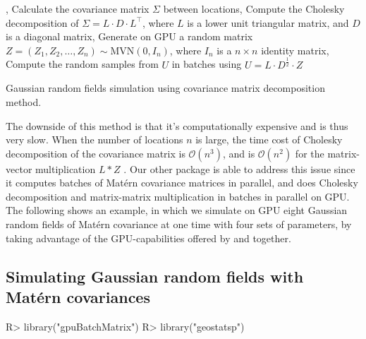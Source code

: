 \documentclass[article,nojss]{jss}\usepackage[]{graphicx}\usepackage[]{color}
\begin{document}
\begin{algorithm}[H]
, Calculate the covariance matrix $\Sigma$ between locations, Compute the Cholesky decomposition of $\Sigma = L \cdot D \cdot L^\top$, where $L$ is a lower unit triangular matrix, and $D$ is a diagonal matrix, Generate on GPU a random matrix $Z=(Z_1, Z_2, \dots, Z_n) \sim \text{MVN}(0,I_n)$, where $I_n$ is a $n \times n$ identity matrix, Compute the random samples from $U$ in batches using $U = L \cdot D^{\frac{1}{2}} \cdot Z$ \;
 \caption{Gaussian random fields simulation using covariance matrix decomposition method.}
 \label{algorithm2}
\end{algorithm}

The downside of this method is that it's computationally expensive and is thus very slow. When the number of locations $n$ is large, the time cost of Cholesky decomposition of the covariance matrix is $\mathcal{O}(n^3)$,  and is $\mathcal{O}(n^2)$ for the matrix-vector multiplication $L*Z$ \citep{LiuandLi2019}.  Our other  package  is able to address this issue since it computes batches of Mat\'ern covariance matrices in parallel, and does Cholesky decomposition and matrix-matrix multiplication in batches in parallel on GPU. The following shows an example, in which we simulate on GPU eight Gaussian random fields of Mat\'ern covariance at one time with four sets of parameters, by taking advantage of the GPU-capabilities offered by  and  together.

\subsection{Simulating Gaussian random fields with Mat\'ern covariances}
\begin{CodeChunk}
\begin{CodeInput}
R> library("gpuBatchMatrix")
R> library("geostatsp")
\end{CodeInput} 
\end{CodeChunk} 
\end{document}
